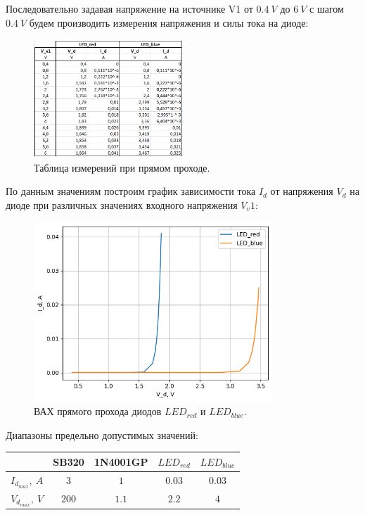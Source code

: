 \documentclass[12pt]{article}
\begin{document}
Последовательно задавая напряжение на источнике V1 от $0.4 \ V$ до $6 \ V$ с шагом $0.4 \ V$ будем производить измерения напряжения и силы тока на диоде:
\begin{figure}[H]
    \centering
    \includegraphics[width=0.5\textwidth]{table_dir_b_r.png}
    \caption{Таблица измерений при прямом проходе.}
    \label{fig:table_dir_b_r} 
\end{figure}

По данным значениям построим график зависимости тока $I_d$ от напряжения $V_d$ на диоде при различных значениях входного напряжения $V_v1$:
\begin{figure}[H]
    \centering
    \includegraphics[width=0.8\textwidth]{vac_b_r_dir.png}
    \caption{ВАХ прямого прохода диодов $LED_{red}$ и $LED_{blue}$.}
    \label{fig:vac_b_r_dir}
\end{figure}

Диапазоны предельно допустимых значений:
\begin{center}
\begin{tabular}{ c|c c c c } 
   & SB320 & 1N4001GP & $LED_{red}$ & $LED_{blue}$ \\ 
   \hline
  $I_{d_{max}}, \ A$ & $3$ & $1$ & $0.03$ & $0.03$ \\ 
  $V_{d_{max}}, \ V$ & $200$ & $1.1$ & $2.2$ & $4$ \\ 
\end{tabular}
\end{center}
\end{document}
